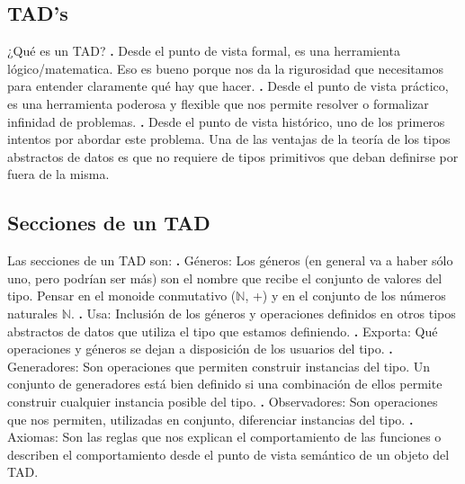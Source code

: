 \documentclass[10pt,a4paper]{article}
\begin{document}
\subsection{TAD's}

¿Qué es un TAD?
\newline
\newline
\textbf{.} Desde el punto de vista formal, es una herramienta lógico/matematica. Eso es bueno porque nos da la rigurosidad que necesitamos para entender claramente qué hay que hacer.
\newline
\newline
\textbf{.} Desde el punto de vista práctico, es una herramienta poderosa y flexible que nos permite resolver o formalizar infinidad de problemas.
\newline
\newline
\textbf{.} Desde el punto de vista histórico, uno de los primeros intentos por abordar este problema.
\newline
\newline
Una de las ventajas de la teoría de los tipos abstractos de datos es que no requiere de tipos primitivos que deban definirse por fuera de la misma. 

\subsection{Secciones de un TAD}

Las secciones de un TAD son:
\newline
\newline
\textbf{.} Géneros: Los géneros (en general va a haber sólo uno, pero podrían ser más) son el nombre que recibe el conjunto de valores del tipo. Pensar en el monoide conmutativo ($\mathbb{N}$, +) y en el conjunto de los números naturales $\mathbb{N}$. 
\newline
\newline
\textbf{.} Usa: Inclusión de los géneros y operaciones definidos en otros tipos abstractos de datos que utiliza el tipo que estamos definiendo.
\newline
\newline
\textbf{.} Exporta: Qué operaciones y géneros se dejan a disposición de los usuarios del tipo.
\newline
\newline
\textbf{.} Generadores: Son operaciones que permiten construir instancias del tipo. Un conjunto de generadores está bien definido si una combinación de ellos permite construir cualquier instancia posible del tipo.
\newline
\newline
\textbf{.} Observadores: Son operaciones que nos permiten, utilizadas en conjunto, diferenciar instancias del tipo.
\newline
\newline
\textbf{.} Axiomas: Son las reglas que nos explican el comportamiento de las funciones o describen el comportamiento desde el punto de vista semántico de un objeto del TAD. 
\newpage
\end{document}
